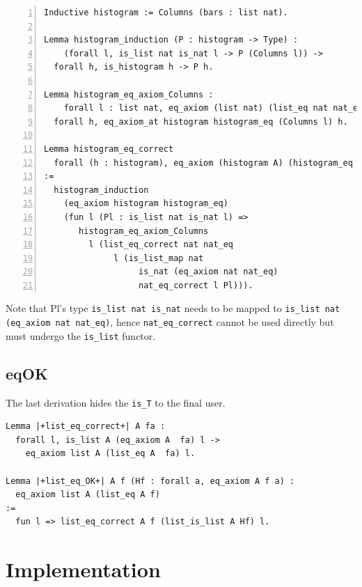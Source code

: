 \documentclass[sigplan,10pt,review]{acmart}\settopmatter{printfolios=true,printccs=false,printacmref=false}
\begin{document}
\begin{minipage}{\textwidth}\begin{lstlisting}[numbers=left]
Inductive histogram := Columns (bars : list nat).

Lemma histogram_induction (P : histogram -> Type) :
    (forall l, is_list nat is_nat l -> P (Columns l)) ->
  forall h, is_histogram h -> P h.

Lemma histogram_eq_axiom_Columns :
    forall l : list nat, eq_axiom (list nat) (list_eq nat nat_eq) l ->
  forall h, eq_axiom_at histogram histogram_eq (Columns l) h.

Lemma histogram_eq_correct 
  forall (h : histogram), eq_axiom (histogram A) (histogram_eq A fa) h
:=
  histogram_induction 
    (eq_axiom histogram histogram_eq)
    (fun l (Pl : is_list nat is_nat l) =>
       histogram_eq_axiom_Columns
         l (list_eq_correct nat nat_eq
              l (is_list_map nat
                   is_nat (eq_axiom nat nat_eq)
                   nat_eq_correct l Pl))).
\end{lstlisting}\end{minipage}

\noindent
Note that Pl's type \lstinline+is_list nat is_nat+
needs to be mapped to \lstinline+is_list nat (eq_axiom nat nat_eq)+,
hence \lstinline+nat_eq_correct+ cannot be used directly
but must undergo the \lstinline+is_list+ functor.

\subsection{eqOK} %

The last derivation hides the \lstinline+is_T+ to the final user.

\begin{minipage}{\textwidth}\begin{lstlisting}
Lemma |+list_eq_correct+| A fa :
  forall l, is_list A (eq_axiom A  fa) l ->
    eq_axiom list A (list_eq A  fa) l.

Lemma |+list_eq_OK+| A f (Hf : forall a, eq_axiom A f a) :
  eq_axiom list A (list_eq A f)
:=
  fun l => list_eq_correct A f (list_is_list A Hf) l.
\end{lstlisting}\end{minipage}


\section{Implementation} %
\label{sec:elpi}
\end{document}
